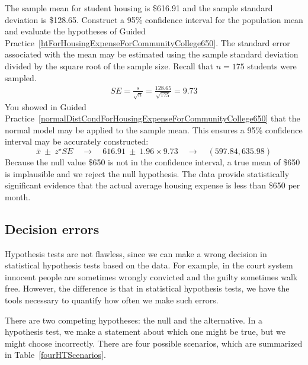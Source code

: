 \begin{example}{The sample mean for student housing is \$616.91 and the sample standard deviation is \$128.65. Construct a 95\% confidence interval for the population mean and evaluate the hypotheses of Guided Practice~\ref{htForHousingExpenseForCommunityCollege650}.}
The standard error associated with the mean may be estimated using the sample standard deviation divided by the square root of the sample size. Recall that $n = 175$ students were sampled.
\begin{align*}
SE = \frac{s}{\sqrt{n}} = \frac{128.65}{\sqrt{175}} = 9.73
\end{align*}
You showed in Guided Practice~\ref{normalDistCondForHousingExpenseForCommunityCollege650} that the normal model may be applied to the sample mean. This ensures a 95\% confidence interval may be accurately constructed:
$$\bar{x}\ \pm\ z^{\star} SE \quad\to\quad 616.91\ \pm\ 1.96 \times 9.73 \quad \to \quad (597.84, 635.98) $$
Because the null value \$650 is not in the confidence interval, a true mean of \$650 is implausible and we reject the null hypothesis. The data provide statistically significant evidence that the actual average housing expense is less than \$650 per month.
\end{example}


\subsection{Decision errors}


Hypothesis tests are not flawless, since we can make a wrong decision in statistical hypothesis tests based on the data. For example, in the court system innocent people are sometimes wrongly convicted and the guilty sometimes walk free. However, the difference is that in statistical hypothesis tests, we have the tools necessary to quantify how often we make such errors.


There are two competing hypotheses: the null and the alternative. In a hypothesis test, we make a statement about which one might be true, but we might choose incorrectly. There are four possible scenarios, which are summarized in Table~\ref{fourHTScenarios}.


